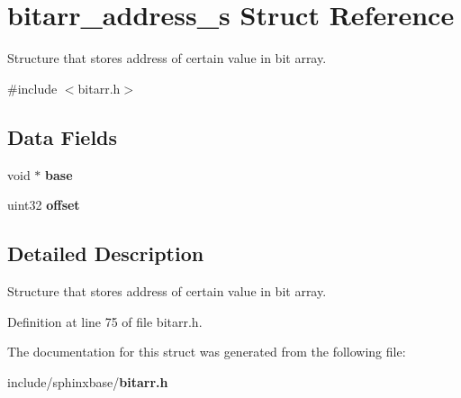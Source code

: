 \section{bitarr\-\_\-address\-\_\-s Struct Reference}
\label{structbitarr__address__s}


Structure that stores address of certain value in bit array.  




{\ttfamily \#include $<$bitarr.\-h$>$}

\subsection*{Data Fields}
\begin{DoxyCompactItemize}
\item 
void $\ast$ {\bfseries base}\label{structbitarr__address__s_a2ac6eb57a1f8feea9d3ab947af61cd26}

\item 
uint32 {\bfseries offset}\label{structbitarr__address__s_a25e454a04427113d373f6200a6c87de2}

\end{DoxyCompactItemize}


\subsection{Detailed Description}
Structure that stores address of certain value in bit array. 

Definition at line 75 of file bitarr.\-h.



The documentation for this struct was generated from the following file\-:\begin{DoxyCompactItemize}
\item 
include/sphinxbase/{\bf bitarr.\-h}\end{DoxyCompactItemize}
